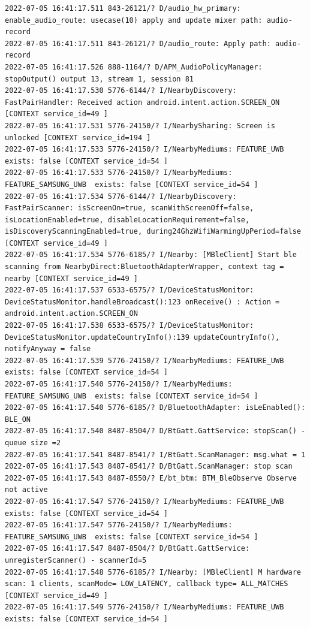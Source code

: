 \documentclass[a4paper,12pt]{book}
\begin{document}
\begin{lstlisting}
2022-07-05 16:41:17.511 843-26121/? D/audio_hw_primary: enable_audio_route: usecase(10) apply and update mixer path: audio-record
2022-07-05 16:41:17.511 843-26121/? D/audio_route: Apply path: audio-record
2022-07-05 16:41:17.526 888-1164/? D/APM_AudioPolicyManager: stopOutput() output 13, stream 1, session 81
2022-07-05 16:41:17.530 5776-6144/? I/NearbyDiscovery: FastPairHandler: Received action android.intent.action.SCREEN_ON [CONTEXT service_id=49 ]
2022-07-05 16:41:17.531 5776-24150/? I/NearbySharing: Screen is unlocked [CONTEXT service_id=194 ]
2022-07-05 16:41:17.533 5776-24150/? I/NearbyMediums: FEATURE_UWB exists: false [CONTEXT service_id=54 ]
2022-07-05 16:41:17.533 5776-24150/? I/NearbyMediums: FEATURE_SAMSUNG_UWB  exists: false [CONTEXT service_id=54 ]
2022-07-05 16:41:17.534 5776-6144/? I/NearbyDiscovery: FastPairScanner: isScreenOn=true, scanWithScreenOff=false, isLocationEnabled=true, disableLocationRequirement=false, isDiscoveryScanningEnabled=true, during24GhzWifiWarmingUpPeriod=false [CONTEXT service_id=49 ]
2022-07-05 16:41:17.534 5776-6185/? I/Nearby: [MBleClient] Start ble scanning from NearbyDirect:BluetoothAdapterWrapper, context tag = nearby [CONTEXT service_id=49 ]
2022-07-05 16:41:17.537 6533-6575/? I/DeviceStatusMonitor: DeviceStatusMonitor.handleBroadcast():123 onReceive() : Action = android.intent.action.SCREEN_ON
2022-07-05 16:41:17.538 6533-6575/? I/DeviceStatusMonitor: DeviceStatusMonitor.updateCountryInfo():139 updateCountryInfo(), notifyAnyway = false
2022-07-05 16:41:17.539 5776-24150/? I/NearbyMediums: FEATURE_UWB exists: false [CONTEXT service_id=54 ]
2022-07-05 16:41:17.540 5776-24150/? I/NearbyMediums: FEATURE_SAMSUNG_UWB  exists: false [CONTEXT service_id=54 ]
2022-07-05 16:41:17.540 5776-6185/? D/BluetoothAdapter: isLeEnabled(): BLE_ON
2022-07-05 16:41:17.540 8487-8504/? D/BtGatt.GattService: stopScan() - queue size =2
2022-07-05 16:41:17.541 8487-8541/? I/BtGatt.ScanManager: msg.what = 1
2022-07-05 16:41:17.543 8487-8541/? D/BtGatt.ScanManager: stop scan
2022-07-05 16:41:17.543 8487-8550/? E/bt_btm: BTM_BleObserve Observe not active
2022-07-05 16:41:17.547 5776-24150/? I/NearbyMediums: FEATURE_UWB exists: false [CONTEXT service_id=54 ]
2022-07-05 16:41:17.547 5776-24150/? I/NearbyMediums: FEATURE_SAMSUNG_UWB  exists: false [CONTEXT service_id=54 ]
2022-07-05 16:41:17.547 8487-8504/? D/BtGatt.GattService: unregisterScanner() - scannerId=5
2022-07-05 16:41:17.548 5776-6185/? I/Nearby: [MBleClient] M hardware scan: 1 clients, scanMode= LOW_LATENCY, callback type= ALL_MATCHES [CONTEXT service_id=49 ]
2022-07-05 16:41:17.549 5776-24150/? I/NearbyMediums: FEATURE_UWB exists: false [CONTEXT service_id=54 ]

\end{lstlisting}
\end{document}
